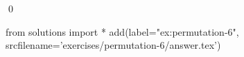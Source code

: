 
\begin{ex} 
  \label{ex:permutation-6}
  
  \qed
\end{ex} 
\begin{python0}
from solutions import *
add(label="ex:permutation-6",
    srcfilename='exercises/permutation-6/answer.tex') 
\end{python0}
